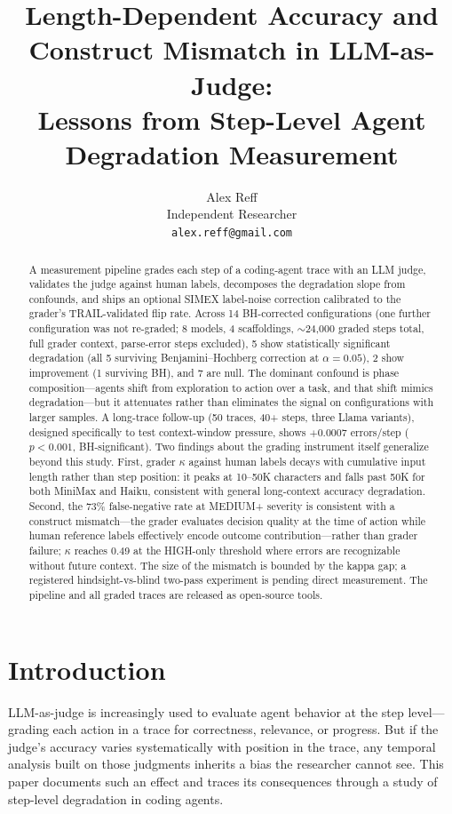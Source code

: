 \documentclass[11pt]{article}
\title{Length-Dependent Accuracy and Construct Mismatch in LLM-as-Judge:\\Lessons from Step-Level Agent Degradation Measurement}
\author{Alex Reff\\Independent Researcher\\\texttt{alex.reff@gmail.com}}
\date{}
\begin{document}
\maketitle

\begin{abstract}
A measurement pipeline grades each step of a coding-agent trace with an LLM judge, validates the judge against human labels, decomposes the degradation slope from confounds, and ships an optional SIMEX label-noise correction calibrated to the grader's TRAIL-validated flip rate.
Across 14 BH-corrected configurations (one further configuration was not re-graded; 8 models, 4 scaffoldings, ${\sim}$24,000 graded steps total, full grader context, parse-error steps excluded), 5 show statistically significant degradation (all 5 surviving Benjamini--Hochberg correction at $\alpha=0.05$), 2 show improvement (1 surviving BH), and 7 are null.
The dominant confound is phase composition---agents shift from exploration to action over a task, and that shift mimics degradation---but it attenuates rather than eliminates the signal on configurations with larger samples.
A long-trace follow-up (50 traces, 40+ steps, three Llama variants), designed specifically to test context-window pressure, shows $+0.0007$ errors/step ($p < 0.001$, BH-significant).
Two findings about the grading instrument itself generalize beyond this study.
First, grader $\kappa$ against human labels decays with cumulative input length rather than step position: it peaks at 10--50K characters and falls past 50K for both MiniMax and Haiku, consistent with general long-context accuracy degradation.
Second, the 73\% false-negative rate at MEDIUM+ severity is consistent with a construct mismatch---the grader evaluates decision quality at the time of action while human reference labels effectively encode outcome contribution---rather than grader failure; $\kappa$ reaches 0.49 at the HIGH-only threshold where errors are recognizable without future context. The size of the mismatch is bounded by the kappa gap; a registered hindsight-vs-blind two-pass experiment is pending direct measurement.
The pipeline and all graded traces are released as open-source tools.
\end{abstract}

\section{Introduction}

LLM-as-judge is increasingly used to evaluate agent behavior at the step level---grading each action in a trace for correctness, relevance, or progress.
But if the judge's accuracy varies systematically with position in the trace, any temporal analysis built on those judgments inherits a bias the researcher cannot see.
This paper documents such an effect and traces its consequences through a study of step-level degradation in coding agents.
\end{document}
